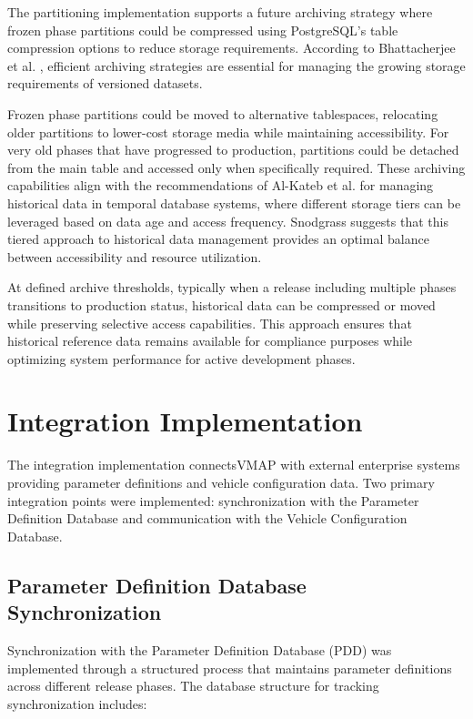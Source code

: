 The partitioning implementation supports a future archiving strategy where frozen phase partitions could be compressed using PostgreSQL's table compression options to reduce storage requirements. According to Bhattacherjee et al. \cite{bhattacherjee2015principles}, efficient archiving strategies are essential for managing the growing storage requirements of versioned datasets.

Frozen phase partitions could be moved to alternative tablespaces, relocating older partitions to lower-cost storage media while maintaining accessibility. For very old phases that have progressed to production, partitions could be detached from the main table and accessed only when specifically required. These archiving capabilities align with the recommendations of Al-Kateb et al. \cite{al2013temporal} for managing historical data in temporal database systems, where different storage tiers can be leveraged based on data age and access frequency. Snodgrass \cite{snodgrass1999developing} suggests that this tiered approach to historical data management provides an optimal balance between accessibility and resource utilization.

At defined archive thresholds, typically when a release including multiple phases transitions to production status, historical data can be compressed or moved while preserving selective access capabilities. This approach ensures that historical reference data remains available for compliance purposes while optimizing system performance for active development phases.


\section{Integration Implementation}
\label{sec:integration-implementation}

The integration implementation connects\ac{VMAP} with external enterprise systems providing parameter definitions and vehicle configuration data. Two primary integration points were implemented: synchronization with the Parameter Definition Database and communication with the Vehicle Configuration Database.

\subsection{Parameter Definition Database Synchronization}
\label{subsec:pdd-synchronization}

Synchronization with the Parameter Definition Database (PDD) was implemented through a structured process that maintains parameter definitions across different release phases. The database structure for tracking synchronization includes:

